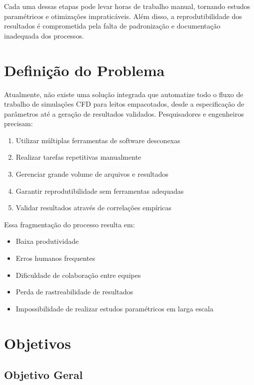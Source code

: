 Cada uma dessas etapas pode levar horas de trabalho manual, tornando estudos paramétricos e otimizações impraticáveis. Além disso, a reprodutibilidade dos resultados é comprometida pela falta de padronização e documentação inadequada dos processos.

\section{Definição do Problema}

Atualmente, não existe uma solução integrada que automatize todo o fluxo de trabalho de simulações CFD para leitos empacotados, desde a especificação de parâmetros até a geração de resultados validados. Pesquisadores e engenheiros precisam:

\begin{enumerate}
    \item Utilizar múltiplas ferramentas de software desconexas
    \item Realizar tarefas repetitivas manualmente
    \item Gerenciar grande volume de arquivos e resultados
    \item Garantir reprodutibilidade sem ferramentas adequadas
    \item Validar resultados através de correlações empíricas
\end{enumerate}

Essa fragmentação do processo resulta em:
\begin{itemize}
    \item Baixa produtividade
    \item Erros humanos frequentes
    \item Dificuldade de colaboração entre equipes
    \item Perda de rastreabilidade de resultados
    \item Impossibilidade de realizar estudos paramétricos em larga escala
\end{itemize}

\section{Objetivos}

\subsection{Objetivo Geral}

